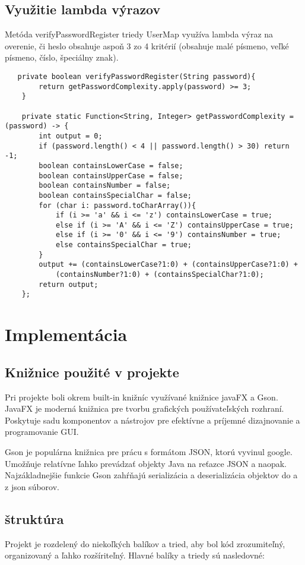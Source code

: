 \documentclass{article}
\begin{document}
\subsection{Využitie lambda výrazov}
Metóda verifyPasswordRegister triedy UserMap využíva lambda výraz na overenie, či heslo obsahuje aspoň 3 zo 4 kritérií (obsahuje malé písmeno, veľké písmeno, číslo, špeciálny znak).

\begin{verbatim}
   private boolean verifyPasswordRegister(String password){
        return getPasswordComplexity.apply(password) >= 3;
    }

    private static Function<String, Integer> getPasswordComplexity = (password) -> {
        int output = 0;
        if (password.length() < 4 || password.length() > 30) return -1;
        boolean containsLowerCase = false;
        boolean containsUpperCase = false;
        boolean containsNumber = false;
        boolean containsSpecialChar = false;
        for (char i: password.toCharArray()){
            if (i >= 'a' && i <= 'z') containsLowerCase = true;
            else if (i >= 'A' && i <= 'Z') containsUpperCase = true;
            else if (i >= '0' && i <= '9') containsNumber = true;
            else containsSpecialChar = true;
        }
        output += (containsLowerCase?1:0) + (containsUpperCase?1:0) + 
            (containsNumber?1:0) + (containsSpecialChar?1:0);
        return output;
    };
\end{verbatim}

\section{Implementácia}
\subsection{Knižnice použité v projekte}
Pri projekte boli okrem built-in knižníc využívané knižnice javaFX a Gson.
JavaFX je moderná knižnica pre tvorbu grafických používateľských rozhraní. Poskytuje sadu komponentov a nástrojov pre efektívne a príjemné dizajnovanie a programovanie GUI. 

Gson je populárna knižnica pre prácu s formátom JSON, ktorú vyvinul google. Umožňuje relatívne ľahko prevádzať objekty Java na reťazce JSON a naopak. Najzákladnejšie funkcie Gson zahŕňajú serializácia a deserializácia objektov do a z json súborov.

\subsection{štruktúra}
Projekt je rozdelený do niekoľkých balíkov a tried, aby bol kód zrozumiteľný, organizovaný a ľahko rozšíriteľný. Hlavné balíky a triedy sú nasledovné:
\end{document}
